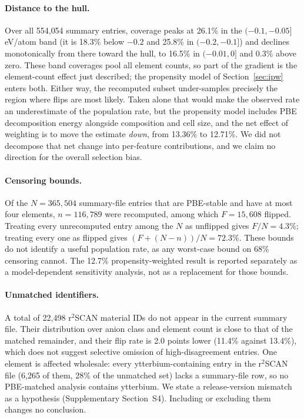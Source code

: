 \documentclass[11pt]{article}
\begin{document}
\paragraph{Distance to the hull.} Over all 554{,}054 summary entries, coverage peaks at 26.1\% in the
$(-0.1,-0.05]$ eV/atom band (it is 18.3\% below $-0.2$ and 25.8\% in $(-0.2,-0.1]$) and declines
monotonically from
there toward the hull, to 16.5\% in $(-0.01,0]$ and 0.3\% above zero. These band
coverages pool all element counts, so part of the gradient is the element-count effect
just described; the propensity model of Section~\ref{sec:ipw} enters both. Either way,
the recomputed subset under-samples precisely the region where flips are most likely.
Taken alone that would make the observed rate an underestimate of the population rate,
but the propensity model includes PBE decomposition energy alongside
composition and cell size, and the net effect of weighting is to move the estimate
\emph{down}, from 13.36\% to 12.71\%. We did not decompose that net change into
per-feature contributions, and we claim no direction for the overall selection bias.

\paragraph{Censoring bounds.} Of the $N=365{,}504$ summary-file entries that are
PBE-stable and have at most four elements, $n=116{,}789$ were recomputed, among which
$F=15{,}608$ flipped. Treating every unrecomputed entry among the $N$ as unflipped gives
$F/N = 4.3\%$; treating every one as flipped gives $(F + (N-n))/N = 72.3\%$. These bounds
do not identify a useful population rate, as any worst-case bound on 68\% censoring
cannot. The 12.7\% propensity-weighted result is reported separately as a
model-dependent sensitivity analysis, not as a replacement for those bounds.

\paragraph{Unmatched identifiers.} A total of 22{,}498 r$^2$SCAN material IDs do not appear in the
current summary file. Their distribution over anion class and element count is close to
that of the matched remainder, and their flip rate is 2.0 points lower (11.4\% against
13.4\%), which does not suggest selective omission of high-disagreement entries. One
element is affected wholesale: every ytterbium-containing entry in the r$^2$SCAN file
(6{,}265 of them, 28\% of the unmatched set) lacks a summary-file row, so no PBE-matched
analysis contains ytterbium. We state a
release-version mismatch as a hypothesis (Supplementary Section~S4). Including or
excluding them changes no conclusion.
\end{document}
